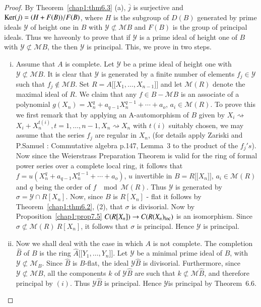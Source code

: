 \begin{proof}
By Theorem~\ref{chap1:thm6.3} (a), $\bar{j}$ is surjective and $\Ker(j) =
{(H+F(B))}/\break F(B)$, where $H$ is the subgroup of $D(B)$ generated by
prime ideals $\mathscr{Y}$ of height one in $B$ with $\mathscr{Y}
\nsubset \mathscr{M} B$ and $F(B)$ is the group of principal
ideals. Thus we have\pageoriginale only to prove that if $\mathscr{Y}$
is a prime 
ideal of height one of $B$ with $\mathscr{Y} \nsubset \mathscr{M} B$,
the then $\mathscr{Y}$ is principal. This, we prove in two steps.  
 \begin{enumerate}[(i)]
\item Assume that $A$ is complete. Let $\mathscr{Y}$ be a prime ideal
  of height one with $\mathscr{Y} \nsubset \mathscr{M} B$. It is clear
  that $\mathscr{Y}$ is generated by a finite number of elements $f_j
  \in \mathscr{Y}$ such that $f_j \notin \mathscr{M} B$. Set $R = A
  \Big [\big [X_1, \ldots , X_{n-1} \big] \Big]$ and let
  $\mathscr{M} (R)$ denote the maximal ideal of $R$. We claim that any
  $f \in B - \mathscr{M} B$ is an associate of a polynomial $g(X_n) =
  X^q_n + a_{q-1} X^{q-1}_n + \cdots + a_o$, $a_i \in \mathscr{M} (R)$. To prove
  this we first remark that by applying an A-automorphism of $B$ given
  by $X_i \rightsquigarrow$  $X_i + X^{t(i)}_n, t = 1, \ldots , n-1,
  X_n \rightsquigarrow X_n $ with $t(i)$ suitably chosen, we may
  assume that the series $f_j$ are regular in $X_n$, (for details
  apply Zariski and P.Samuel : Commutative algebra p.147, Lemma~3 to
  the product of the $f_j's$). Now since the Weierstrass 
  Preparation Theorem is valid for the ring of formal power series
  over a complete local ring, it follows that $f = u(X^q_n + a_{q-1}
  X^{q-1}_n + \cdots + a_o)$, $u$ invertible in $B = R \Big[\big [X_n
      \big]\Big]$, $a_i \in \mathscr{M} (R)$ and $q$ being the order
  of $f$ $\mod \mathscr{M}(R)$. Thus $\mathscr{Y}$ is generated by
  $\sigma = \mathscr{Y} \cap R [X_n]$. Now, since $B$ is $R [X_n]$ -
  flat it follows by Theorem~\ref{chap1:thm6.2}, (2), that $\sigma$ is
  divisorial. Now by Proposition~\ref{chap1:prop7.5}  $C(R [X_n] ) \rightarrow
  C(R(X_n)_{\operatorname{loc}})$ is an isomorphism. Since $\sigma \nsubset
  \mathscr{M} (R) ~ R [X_n]$, it follows that $\sigma $ is
  principal. Hence $\mathscr{Y}$ is principal. 

  \item Now we shall deal with the case in which $A$ is not
    complete. The completion $\hat{B}$ of $B$ is the ring $\hat {A}
    \Big [\big [Y_1, \ldots , Y_n \big] \Big]$. Let $\mathscr{Y}$ be a
    minimal prime ideal of $B$, with $\mathscr{Y} \nsubset
    \mathscr{M}_B$. Since $\hat{B}$ is $B$-flat, the ideal
    $\mathscr{Y} \hat{B}$ is 
    divisorial. Furthermore, since $\mathscr{Y} \nsubset \mathscr{M}
    B$, all the components $k$ of $\mathscr{Y}\hat{B}$ are such that
    $k \nsubset \mathscr{M} \hat{B}$, and therefore
    principal by $(i)$. Thus $\mathscr{Y} \hat{B}$ is principal. Hence
    $\mathscr{Y}$\pageoriginale is principal by Theorem~6.6. 
  \end{enumerate}
  \end{proof}

